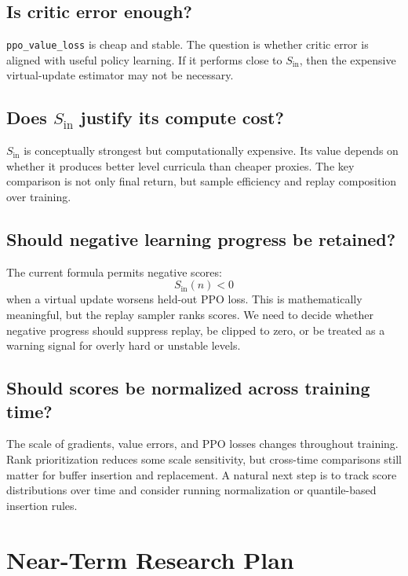\documentclass[11pt]{article}
\begin{document}
\subsection{Is critic error enough?}

\texttt{ppo\_value\_loss} is cheap and stable. The question is whether critic error is
aligned with useful policy learning. If it performs close to $S_{\mathrm{in}}$, then the
expensive virtual-update estimator may not be necessary.

\subsection{Does $S_{\mathrm{in}}$ justify its compute cost?}

$S_{\mathrm{in}}$ is conceptually strongest but computationally expensive. Its value
depends on whether it produces better level curricula than cheaper proxies. The
key comparison is not only final return, but sample efficiency and replay
composition over training.

\subsection{Should negative learning progress be retained?}

The current formula permits negative scores:
\begin{equation}
  S_{\mathrm{in}}(n) < 0
\end{equation}
when a virtual update worsens held-out PPO loss. This is mathematically
meaningful, but the replay sampler ranks scores. We need to decide whether
negative progress should suppress replay, be clipped to zero, or be treated as
a warning signal for overly hard or unstable levels.

\subsection{Should scores be normalized across training time?}

The scale of gradients, value errors, and PPO losses changes throughout
training. Rank prioritization reduces some scale sensitivity, but cross-time
comparisons still matter for buffer insertion and replacement. A natural next
step is to track score distributions over time and consider running
normalization or quantile-based insertion rules.

\section{Near-Term Research Plan}
\end{document}
